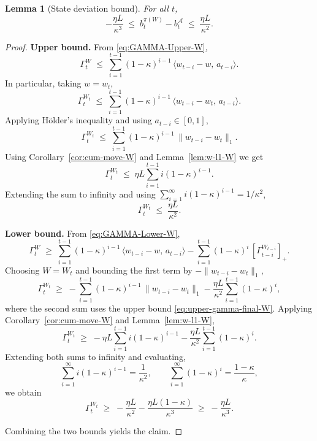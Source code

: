 \documentclass[11pt]{article}
\newtheorem{Thm:Lemma}{Lemma}
\begin{document}
\begin{Thm:Lemma}[State deviation bound]
\label{lem:state-gap-bound-W}
For all \(t\),
\[
-\frac{\eta L}{\kappa^3}
\;\leq\;
b_t^{\pi(W)} - b_t^\mathcal{A}
\;\leq\;
\frac{\eta L}{\kappa^2}.
\]
\end{Thm:Lemma}

\begin{proof}
\textbf{Upper bound.}  
From \eqref{eq:GAMMA-Upper-W},
\[
\Gamma_t^{W}
\;\leq\;
\sum_{i=1}^{t-1} (1-\kappa)^{i-1}\,\langle w_{t-i}-w,\,a_{t-i}\rangle .
\]
In particular, taking \(w=w_t\),
\[
\Gamma_t^{W_t}
\;\leq\;
\sum_{i=1}^{t-1} (1-\kappa)^{i-1}\,\langle w_{t-i}-w_t,\,a_{t-i}\rangle .
\]
Applying Hölder’s inequality and using \(a_{t-i}\in[0,1]\),
\[
\Gamma_t^{W_t}
\;\leq\;
\sum_{i=1}^{t-1} (1-\kappa)^{i-1}\,\|w_{t-i}-w_t\|_1 .
\]
Using Corollary~\ref{cor:cum-move-W} and Lemma~\ref{lem:w-l1-W} we get
\[
\Gamma_t^{W_t}
\;\leq\;
\eta L \sum_{i=1}^{t-1} i (1-\kappa)^{i-1}.
\]
Extending the sum to infinity and using \(\sum_{i=1}^\infty i (1-\kappa)^{i-1} = 1/\kappa^2\),
\begin{equation}
\label{eq:upper-gamma-final-W}
\Gamma_t^{W_t}
\;\leq\;
\frac{\eta L}{\kappa^2}.
\end{equation}

\medskip
\noindent
\textbf{Lower bound.}  
From \eqref{eq:GAMMA-Lower-W},
\[
\Gamma_t^W
\;\geq\;
\sum_{i=1}^{t-1} (1-\kappa)^{i-1}\,\langle w_{t-i}-w,\,a_{t-i}\rangle
-\sum_{i=1}^{t-1} (1-\kappa)^i\,[\Gamma_{t-i}^{W_{t-i}}]_+ .
\]
Choosing \(W=W_t\) and bounding the first term by \(-\|w_{t-i}-w_t\|_1\),
\[
\Gamma_t^{W_t}
\;\geq\;
-\sum_{i=1}^{t-1} (1-\kappa)^{i-1}\,\|w_{t-i}-w_t\|_1
-\frac{\eta L}{\kappa^2}\sum_{i=1}^{t-1} (1-\kappa)^i ,
\]
where the second sum uses the upper bound \eqref{eq:upper-gamma-final-W}.  
Applying Corollary~\ref{cor:cum-move-W} and Lemma~\ref{lem:w-l1-W},
\[
\Gamma_t^{W_t}
\;\geq\;
-\eta L \sum_{i=1}^{t-1} i (1-\kappa)^{i-1}
-\frac{\eta L}{\kappa^2}\sum_{i=1}^{t-1}(1-\kappa)^i .
\]
Extending both sums to infinity and evaluating,
\[
\sum_{i=1}^\infty i (1-\kappa)^{i-1} = \frac{1}{\kappa^2}, 
\qquad
\sum_{i=1}^\infty (1-\kappa)^i = \frac{1-\kappa}{\kappa},
\]
we obtain
\[
\Gamma_t^{W_t}
\;\geq\;
-\frac{\eta L}{\kappa^2} - \frac{\eta L(1-\kappa)}{\kappa^3}
\;\geq\;
-\frac{\eta L}{\kappa^3}.
\]

\medskip
\noindent
Combining the two bounds yields the claim.
\end{proof}
\end{document}
